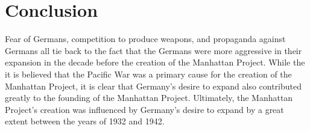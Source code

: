 \documentclass[a4paper,12pt]{article}
\begin{document}

    \section{Conclusion}

        Fear of Germans, competition to produce weapons, and propaganda against Germans all tie back
        to the fact that the Germans were more aggressive in their expansion in the decade before
        the creation of the Manhattan Project. While the it is believed that the Pacific War was a
        primary cause for the creation of the Manhattan Project, it is clear that Germany's desire
        to expand also contributed greatly to the founding of the Manhattan Project. Ultimately, the
        Manhattan Project's creation was influenced by Germany's desire to expand by a great extent
        between the years of 1932 and 1942.


    \printbibliography
\end{document}
